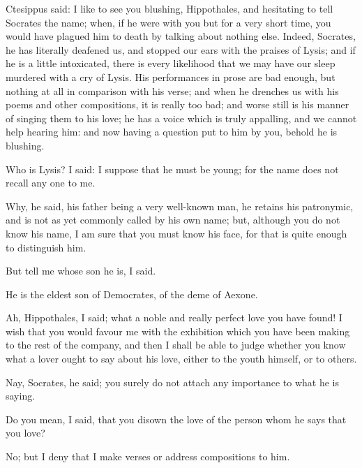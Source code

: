 \documentclass[11pt,letter]{article}
\begin{document}
\par  Ctesippus said: I like to see you blushing, Hippothales, and hesitating to tell Socrates the name; when, if he were with you but for a very short time, you would have plagued him to death by talking about nothing else. Indeed, Socrates, he has literally deafened us, and stopped our ears with the praises of Lysis; and if he is a little intoxicated, there is every likelihood that we may have our sleep murdered with a cry of Lysis. His performances in prose are bad enough, but nothing at all in comparison with his verse; and when he drenches us with his poems and other compositions, it is really too bad; and worse still is his manner of singing them to his love; he has a voice which is truly appalling, and we cannot help hearing him: and now having a question put to him by you, behold he is blushing.

\par  Who is Lysis? I said: I suppose that he must be young; for the name does not recall any one to me.

\par  Why, he said, his father being a very well-known man, he retains his patronymic, and is not as yet commonly called by his own name; but, although you do not know his name, I am sure that you must know his face, for that is quite enough to distinguish him.

\par  But tell me whose son he is, I said.

\par  He is the eldest son of Democrates, of the deme of Aexone.

\par  Ah, Hippothales, I said; what a noble and really perfect love you have found! I wish that you would favour me with the exhibition which you have been making to the rest of the company, and then I shall be able to judge whether you know what a lover ought to say about his love, either to the youth himself, or to others.

\par  Nay, Socrates, he said; you surely do not attach any importance to what he is saying.

\par  Do you mean, I said, that you disown the love of the person whom he says that you love?

\par  No; but I deny that I make verses or address compositions to him.
\end{document}

